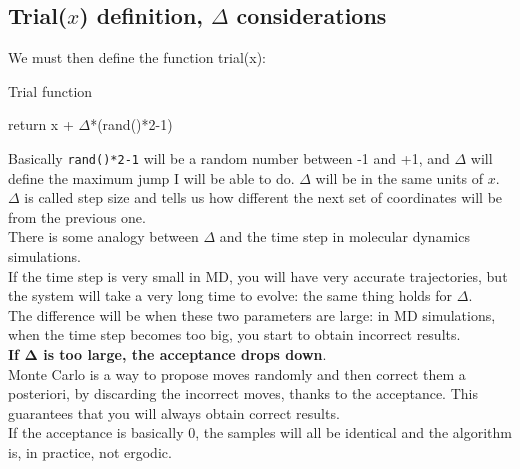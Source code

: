 \subsection{Trial($x$) definition, $\Delta$ considerations}
We must then define the function trial(x):\\
\begin{algorithm}[H]\label{trial}
			\caption{Trial function}
			\begin{algorithmic}[0]
					\State return x + $\Delta$*(rand()*2-1)
				\EndFunction
			\end{algorithmic}
		\end{algorithm}
Basically \texttt{rand()*2-1} will be a random number between -1 and +1, and $\Delta$ will define the maximum jump I will be able to do. $\Delta$ will be in the same units of $x$.\\
$\Delta$ is called step size and tells us how different the next set of coordinates will be  from the previous one.\\
There is some analogy between $\Delta$ and the time step in molecular dynamics simulations.\\
If the time step is very small in MD, you will have very accurate trajectories, but the system will take a very long time to evolve: the same thing holds for $\Delta$.\\
The difference will be when these two parameters are large: in MD simulations, when the time step becomes too big, you start to obtain incorrect results.\\
\textbf{If $\mathbf{\Delta}$ is too large, the acceptance drops down}.\\
Monte Carlo is a way to propose moves randomly and then correct them a posteriori, by discarding the incorrect moves, thanks to the acceptance. This guarantees that you will always obtain correct results.\\ 
If the acceptance is basically 0, the samples will all be identical and the algorithm is, in practice, not ergodic.\\
